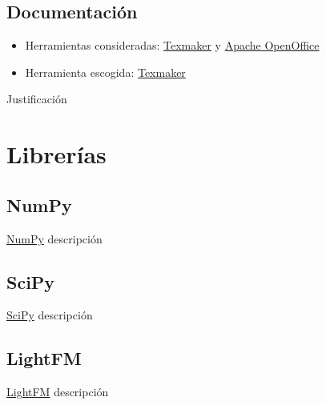 \subsection{Documentación}\label{documentacion}
\begin{itemize}
\tightlist
\item Herramientas consideradas: 
	\href{http://www.xm1math.net/texmaker/}{Texmaker} y
	\href{https://www.openoffice.org/es/}{Apache OpenOffice}
\item Herramienta escogida:
	\href{http://www.xm1math.net/texmaker/}{Texmaker}
\end{itemize}
Justificación

\section{Librerías}\label{librerias}
\subsection{NumPy}\label{numpy}
\href{http://www.numpy.org/}{NumPy} descripción
\subsection{SciPy}\label{scipy}
\href{https://www.scipy.org/scipylib/index.html}{SciPy} descripción
\subsection{LightFM}\label{lightfm}
\href{https://github.com/lyst/lightfm}{LightFM} descripción


